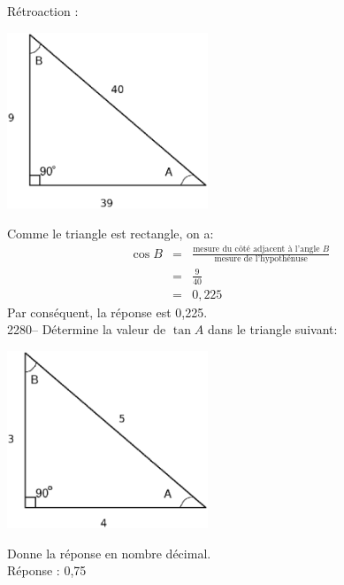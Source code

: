 \documentclass[letterpaper, 12pt]{article}
\begin{document}
R\'etroaction :\\
\begin{center}
 \includegraphics[width=6cm,bb=14 14 444 381]{Triangle_rectangle2279.eps}
\end{center}
Comme le triangle est rectangle, on a:
\begin{eqnarray*}
 \cos{B}&=&\frac{\textrm{mesure du c\^ot\'e adjacent \`a l'angle $B$}}{\textrm{mesure de l'hypoth\'enuse}}\\
&=&\frac{9}{40}\\[2mm]
&=&0,225
\end{eqnarray*}
Par cons\'equent, la r\'eponse est 0,225.\\

2280-- D\'etermine la valeur de $\tan{A}$ dans le triangle suivant:
\begin{center}
 \includegraphics[width=6cm,bb=14 14 445 371]{Triangle_rectangle2276.eps}
\end{center}
Donne la r\'eponse en nombre d\'ecimal.\\

R\'eponse : 0,75\\
\end{document}
